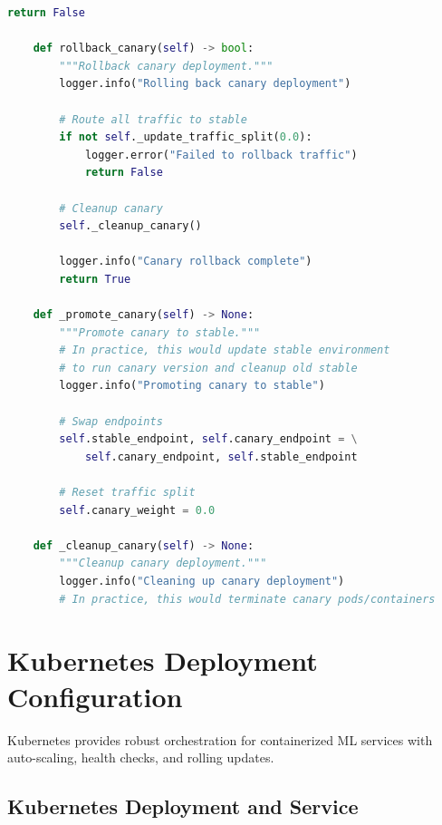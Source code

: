 \begin{lstlisting}[language=Python, caption={Canary Deployment Strategy}]
        return False

    def rollback_canary(self) -> bool:
        """Rollback canary deployment."""
        logger.info("Rolling back canary deployment")

        # Route all traffic to stable
        if not self._update_traffic_split(0.0):
            logger.error("Failed to rollback traffic")
            return False

        # Cleanup canary
        self._cleanup_canary()

        logger.info("Canary rollback complete")
        return True

    def _promote_canary(self) -> None:
        """Promote canary to stable."""
        # In practice, this would update stable environment
        # to run canary version and cleanup old stable
        logger.info("Promoting canary to stable")

        # Swap endpoints
        self.stable_endpoint, self.canary_endpoint = \
            self.canary_endpoint, self.stable_endpoint

        # Reset traffic split
        self.canary_weight = 0.0

    def _cleanup_canary(self) -> None:
        """Cleanup canary deployment."""
        logger.info("Cleaning up canary deployment")
        # In practice, this would terminate canary pods/containers
\end{lstlisting}

\section{Kubernetes Deployment Configuration}

Kubernetes provides robust orchestration for containerized ML services with auto-scaling, health checks, and rolling updates.

\subsection{Kubernetes Deployment and Service}

